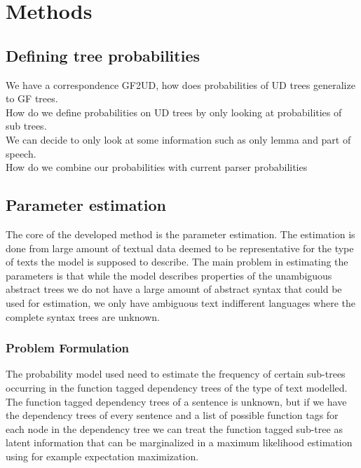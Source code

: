 \chapter{Methods}
\section{Defining tree probabilities}
We have a correspondence GF2UD, how does probabilities of UD trees generalize to GF trees.\\
How do we define probabilities on UD trees by only looking at probabilities of sub trees.\\
We can decide to only look at some information such as only lemma and part of speech.\\
How do we combine our probabilities with current parser probabilities
\section{Parameter estimation}
The core of the developed method is the parameter estimation. The estimation is done from large amount of textual data deemed to be representative for the type of texts the model is supposed to describe. The main problem in estimating the parameters is that while the model describes properties of the unambiguous abstract trees we do not have a large amount of abstract syntax that could be used for estimation, we only have ambiguous text indifferent languages where the complete syntax trees are unknown.
\subsection{Problem Formulation}
The probability model used need to estimate the frequency of certain sub-trees occurring in the function tagged dependency trees of the type of text modelled. The function tagged dependency trees of a sentence is unknown, but if we have the dependency trees of every sentence and a list of possible function tags for each node in the dependency tree we can treat the function tagged sub-tree as latent information that can be marginalized in a maximum likelihood estimation using for example expectation maximization.
